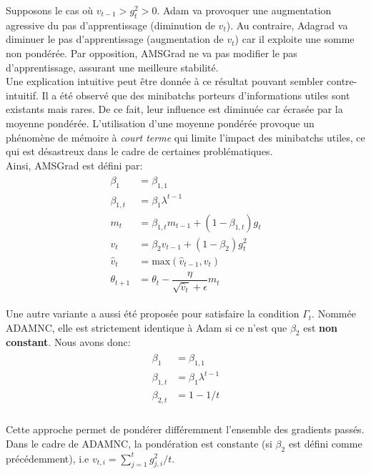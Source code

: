 \noindent Supposons le cas où $v_{t-1}>g_t^2 > 0$. Adam va provoquer une augmentation agressive du pas d'apprentissage (diminution de $v_t$). Au contraire, Adagrad va diminuer le pas d'apprentissage (augmentation de $v_t$) car il exploite une somme non pondérée. Par opposition, AMSGrad ne va pas modifier le pas d'apprentissage, assurant une meilleure stabilité.\\

\noindent Une explication intuitive peut être donnée à ce résultat pouvant sembler contre-intuitif. Il a été observé que des minibatchs porteurs d'informations utiles sont existants mais rares. De ce fait, leur influence est diminuée car écrasée par la moyenne pondérée. L'utilisation d'une moyenne pondérée provoque un phénomène de mémoire à \textit{court terme} qui limite l'impact des minibatchs utiles, ce qui est désastreux dans le cadre de certaines problématiques.\\

\noindent Ainsi, AMSGrad est défini par:
\begin{align*}
\begin{split}
\beta_{1} &= \beta_{1,1}\\
\beta_{1,t} &= \beta_{1}\lambda^{t-1}\\
m_t &= \beta_{1,t} m_{t-1} + (1 - \beta_{1,t}) g_t \\
v_t &= \beta_2 v_{t-1} + (1 - \beta_2) g_t^2\\
\hat{v}_t &= \text{max}(\hat{v}_{t-1}, v_t) \\
\theta_{t+1} &= \theta_{t} - \dfrac{\eta}{\sqrt{\hat{v}_t} + \epsilon} m_t
\end{split}
\end{align*}

\noindent Une autre variante a aussi été proposée pour satisfaire la condition $\Gamma_t$. Nommée ADAMNC, elle est strictement identique à Adam si ce n'est que $\beta_2$ est \textbf{non constant}. Nous avons donc:
\begin{align*}
\begin{split}
\beta_{1} &= \beta_{1,1}\\
\beta_{1,t} &= \beta_{1}\lambda^{t-1}\\
\beta_{2,t} &= 1-1/t\\
\end{split}
\end{align*}

\noindent Cette approche permet de pondérer différemment l'ensemble des gradients passés. Dans le cadre de ADAMNC, la pondération est constante (si $\beta_2$ est défini comme précédemment), i.e $v_{t,i}=\sum_{j=1}^{t}g^2_{j,i}/t$.

